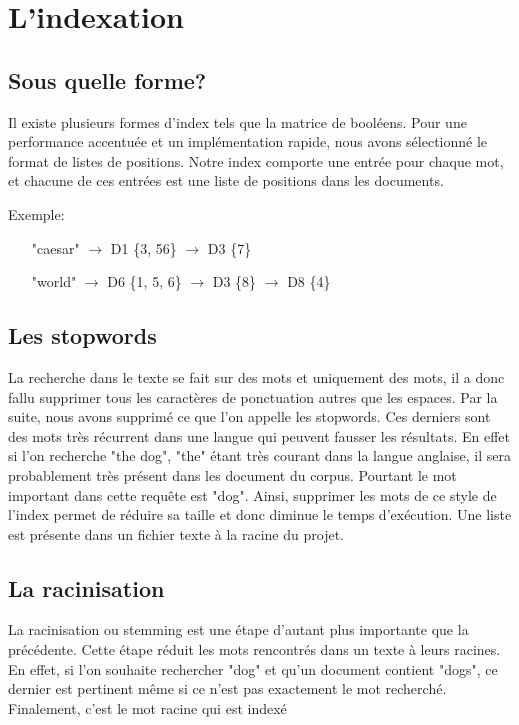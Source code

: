 \documentclass[a4paper,10pt]{article}
\begin{document}
\section{L'indexation}

\subsection{Sous quelle forme?}

Il existe plusieurs formes d'index tels que la matrice de bool\'eens. Pour une performance accentu\'ee et un impl\'ementation rapide, nous avons s\'electionn\'e le format de listes de positions. Notre index comporte une entr\'ee pour chaque mot, et chacune de ces entr\'ees est une liste de positions dans les documents.

Exemple:

\begin{itemize}
 \item ["caesar"] $\rightarrow$ D1 \{3, 56\} $\rightarrow$ D3 \{7\}
 \item ["world"] $\rightarrow$ D6 \{1, 5, 6\} $\rightarrow$ D3 \{8\} $\rightarrow$ D8 \{4\}
\end{itemize}

\subsection{Les stopwords}

La recherche dans le texte se fait sur des mots et uniquement des mots, il a donc fallu supprimer tous les caract\`eres de ponctuation autres que les espaces. Par la suite, nous avons supprim\'e ce que l'on appelle les stopwords. Ces derniers sont des mots tr\`es r\'ecurrent dans une langue qui peuvent fausser les r\'esultats. En effet si l'on recherche "the dog", "the" \'etant tr\`es courant dans la langue anglaise, il sera probablement tr\`es pr\'esent dans les document du corpus. Pourtant le mot important dans cette requ\^ete est "dog". Ainsi, supprimer les mots de ce style de l'index permet de r\'eduire sa taille et donc diminue le temps d'ex\'ecution. Une liste est pr\'esente dans un fichier texte \`a la racine du projet.

\subsection{La racinisation}

La racinisation ou stemming est une \'etape d'autant plus importante que la pr\'ec\'edente. Cette \'etape r\'eduit les mots rencontr\'es dans un texte \`a leurs racines. En effet, si l'on souhaite rechercher "dog" et qu'un document contient "dogs", ce dernier est pertinent m\^eme si ce n'est pas exactement le mot recherch\'e. Finalement, c'est le mot racine qui est index\'e 
\end{document}
